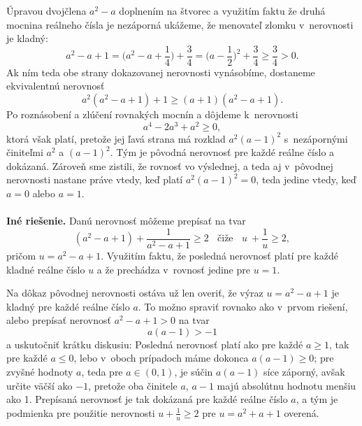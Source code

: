 \rieh Úpravou dvojčlena $a^2 - a$ doplnením na štvorec a využitím faktu že druhá mocnina reálneho čísla je nezáporná ukážeme, že menovateľ zlomku v~nerovnosti je kladný:
$$a^2-a+1=\bigg(a^2-a+\frac{1}{4}\bigg) +\frac{3}{4}=\bigg(a-\frac{1}{2}\bigg)^2+\frac{3}{4}\geq \frac{3}{4}>0.$$
Ak ním teda obe strany dokazovanej nerovnosti vynásobíme, dostaneme ekvivalentnú nerovnosť
$$a^2(a^2-a+1)+1\geq (a+1)(a^2-a+1).$$
Po roznásobení a zlúčení rovnakých mocnín a dôjdeme k~nerovnosti
$$ a^4-2a^3+a^2\geq 0,$$
ktorá však platí, pretože jej ľavá strana má rozklad $a^2 (a - 1)^2$ s~nezápornými činiteľmi $a^2$ a $(a - 1)^2$. Tým je pôvodná nerovnosť pre každé reálne číslo a dokázaná. Zároveň sme zistili, že rovnosť vo výslednej, a teda aj v~pôvodnej nerovnosti nastane práve vtedy, keď platí $a^2 (a - 1)^2 = 0$, teda jedine vtedy, keď $a = 0$ alebo $a = 1$.\\
\\
\textbf{Iné riešenie.} Danú nerovnosť môžeme prepísať na tvar $$ (a^2 - a + 1) + \frac{1}{a^2-a+1}\geq 2 \ \ \ \ \text{čiže} \ \ \ \  u~+\frac{1}{u}\geq 2,$$ pričom $u = a^2 -a + 1$. Využitím faktu, že posledná nerovnosť platí pre každé kladné
reálne číslo $u$ a že prechádza v~rovnosť jedine pre $u = 1$.

Na dôkaz pôvodnej nerovnosti ostáva už len overiť, že výraz $u = a^2 - a + 1$ je kladný pre každé reálne číslo $a$. To možno spraviť rovnako ako v~prvom riešení, alebo prepísať nerovnosť $a^2 - a + 1 > 0$ na tvar $$a(a -1) > -1$$ a uskutočniť krátku diskusiu: Posledná nerovnosť platí ako pre každé $a \geq 1$, tak pre každé $a\leq 0$, lebo v~oboch prípadoch máme dokonca $a(a - 1) \geq 0$; pre zvyšné hodnoty $a$, teda pre $a \in (0, 1)$, je súčin $a(a - 1)$ síce záporný, avšak určite väčší ako $-1$, pretože oba činitele $a$, $a - 1$ majú absolútnu hodnotu menšiu ako 1. Prepísaná nerovnosť je
tak dokázaná pre každé reálne číslo $a$, a tým je podmienka pre použitie nerovnosti $u + \frac{1}{u} \geq 2$ pre $u = a^2 + a + 1$ overená.

